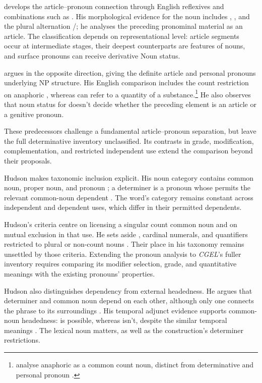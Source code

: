\documentclass[12pt]{article}
\begin{document}
\textcite{postal1966} develops the article--pronoun connection through English reflexives and combinations such as . His morphological evidence for the noun  includes , , and the plural alternation /; he analyses the preceding pronominal material as an article. The classification depends on representational level: article segments occur at intermediate stages, their deepest counterparts are features of nouns, and surface pronouns can receive derivative Noun status.

\textcite[197--203]{sommerstein1972} argues in the opposite direction, giving the definite article and personal pronouns underlying NP structure. His English comparison includes the count restriction on anaphoric , whereas  can refer to a quantity of a substance.\footnote{\textcite[797--798]{payne2013anaphoric} analyse anaphoric  as a common count noun, distinct from determinative  and personal pronoun .} He also observes that noun status for  doesn't decide whether the preceding element is an article or a genitive pronoun.

These predecessors challenge a fundamental article--pronoun separation, but leave the full determinative inventory unclassified. Its contrasts in grade, modification, complementation, and restricted independent use extend the comparison beyond their proposals.

Hudson makes taxonomic inclusion explicit. His noun category contains common noun, proper noun, and pronoun \citep[253--254]{hudson2010wordgrammar}; a determiner is a pronoun whose  permits the relevant common-noun dependent \citep[9--10]{hudson2004determiners}. The word's category remains constant across independent and dependent uses, which differ in their permitted dependents.

Hudson's criteria centre on licensing a singular count common noun and on mutual exclusion in that use. He sets aside , cardinal numerals, and quantifiers restricted to plural or non-count nouns \citep[9--10]{hudson2004determiners}. Their place in his taxonomy remains unsettled by those criteria. Extending the pronoun analysis to \textit{CGEL}'s fuller inventory requires comparing its modifier selection, grade, and quantitative meanings with the existing pronouns' properties.

Hudson also distinguishes dependency from external headedness. He argues that determiner and common noun depend on each other, although only one connects the phrase to its surroundings \citep[7--8]{hudson2004determiners}. His temporal adjunct evidence supports common-noun headedness:  is possible, whereas  isn't, despite the similar temporal meanings \citep[10--12]{hudson2004determiners}. The lexical noun matters, as well as the construction's determiner restrictions.
\end{document}
